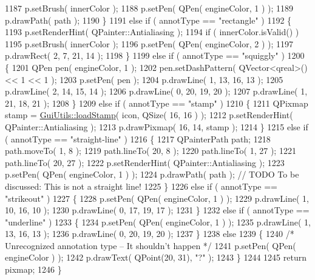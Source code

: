 \begin{DoxyCode}
1187             p.setBrush( innerColor );
1188         p.setPen( QPen( engineColor, 1 ) );
1189         p.drawPath( path );
1190     \}
1191     \textcolor{keywordflow}{else} \textcolor{keywordflow}{if} ( annotType == \textcolor{stringliteral}{"rectangle"} )
1192     \{
1193         p.setRenderHint( QPainter::Antialiasing );
1194         \textcolor{keywordflow}{if} ( innerColor.isValid() )
1195             p.setBrush( innerColor );
1196         p.setPen( QPen( engineColor, 2 ) );
1197         p.drawRect( 2, 7, 21, 14 );
1198     \}
1199     \textcolor{keywordflow}{else} \textcolor{keywordflow}{if} ( annotType == \textcolor{stringliteral}{"squiggly"} )
1200     \{
1201         QPen pen( engineColor, 1 );
1202         pen.setDashPattern( QVector<qreal>() << 1 << 1 );
1203         p.setPen( pen );
1204         p.drawLine( 1, 13, 16, 13 );
1205         p.drawLine( 2, 14, 15, 14 );
1206         p.drawLine( 0, 20, 19, 20 );
1207         p.drawLine( 1, 21, 18, 21 );
1208     \}
1209     \textcolor{keywordflow}{else} \textcolor{keywordflow}{if} ( annotType == \textcolor{stringliteral}{"stamp"} )
1210     \{
1211         QPixmap stamp = \hyperlink{namespaceGuiUtils_a5ba797636890ba5fbc39db6a092f4bd5}{GuiUtils::loadStamp}( icon, QSize( 16, 16 ) );
1212         p.setRenderHint( QPainter::Antialiasing );
1213         p.drawPixmap( 16, 14, stamp );
1214     \}
1215     \textcolor{keywordflow}{else} \textcolor{keywordflow}{if} ( annotType == \textcolor{stringliteral}{"straight-line"} )
1216     \{
1217         QPainterPath path;
1218         path.moveTo( 1, 8 );
1219         path.lineTo( 20, 8 );
1220         path.lineTo( 1, 27 );
1221         path.lineTo( 20, 27 );
1222         p.setRenderHint( QPainter::Antialiasing );
1223         p.setPen( QPen( engineColor, 1 ) );
1224         p.drawPath( path ); \textcolor{comment}{// TODO To be discussed: This is not a straight line!}
1225     \}
1226     \textcolor{keywordflow}{else} \textcolor{keywordflow}{if} ( annotType == \textcolor{stringliteral}{"strikeout"} )
1227     \{
1228         p.setPen( QPen( engineColor, 1 ) );
1229         p.drawLine( 1, 10, 16, 10 );
1230         p.drawLine( 0, 17, 19, 17 );
1231     \}
1232     \textcolor{keywordflow}{else} \textcolor{keywordflow}{if} ( annotType == \textcolor{stringliteral}{"underline"} )
1233     \{
1234         p.setPen( QPen( engineColor, 1 ) );
1235         p.drawLine( 1, 13, 16, 13 );
1236         p.drawLine( 0, 20, 19, 20 );
1237     \}
1238     \textcolor{keywordflow}{else}
1239     \{
1240         \textcolor{comment}{/* Unrecognized annotation type -- It shouldn't happen */}
1241         p.setPen( QPen( engineColor ) );
1242         p.drawText( QPoint(20, 31), \textcolor{stringliteral}{"?"} );
1243     \}
1244 
1245     \textcolor{keywordflow}{return} pixmap;
1246 \}
\end{DoxyCode}
